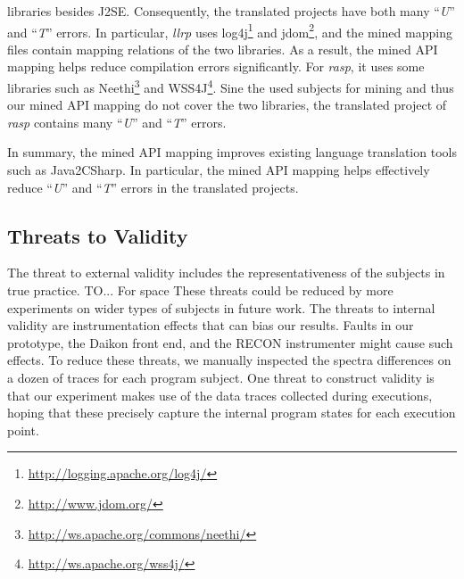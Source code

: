 libraries besides J2SE. Consequently, the translated projects have
both many ``\emph{U}'' and ``\emph{T}'' errors. In particular,
\emph{llrp} uses
log4j\footnote{\url{http://logging.apache.org/log4j/}} and
jdom\footnote{\url{http://www.jdom.org/}}, and the mined mapping
files contain mapping relations of the two libraries. As a result,
the mined API mapping helps reduce compilation errors significantly.
For \emph{rasp}, it uses some libraries such as
Neethi\footnote{\url{http://ws.apache.org/commons/neethi/}} and
WSS4J\footnote{\url{http://ws.apache.org/wss4j/}}. Sine the used
subjects for mining and thus our mined API mapping do not cover the
two libraries, the translated project of \emph{rasp} contains many
``\emph{U}'' and ``\emph{T}'' errors.

In summary, the mined API mapping improves existing language
translation tools such as Java2CSharp. In particular, the mined API
mapping helps effectively reduce ``\emph{U}'' and ``\emph{T}''
errors in the translated projects.


\subsection{Threats to Validity}
\label{sec:evaluation:threats} The threat to external validity
includes the representativeness of the subjects in true practice.
TO... For space These threats could be reduced by more experiments
on wider types of subjects in future work. The threats to internal
validity are instrumentation effects that can bias our results.
Faults in our prototype, the Daikon front end, and the RECON
instrumenter might cause such effects. To reduce these threats, we
manually inspected the spectra differences on a dozen of traces for
each program subject. One threat to construct validity is that our
experiment makes use of the data traces collected during executions,
hoping that these precisely capture the internal program states for
each execution point.

